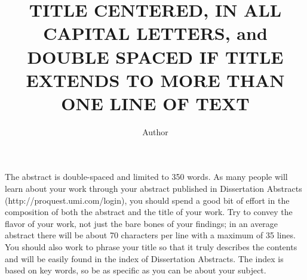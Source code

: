 \documentclass{iuphd}
\begin{document}
\title{TITLE CENTERED, IN ALL CAPITAL LETTERS, and DOUBLE SPACED IF TITLE EXTENDS TO MORE THAN ONE LINE OF TEXT}
\author{Author}
\monthGranted{\DTMmonthname{\month}}
\yearGranted{\the\year}
\maketitle

\acceptancepage%


% 


\begin{abstract*}[\bigskipamount]
 The abstract is double-spaced and limited to 350 words. As many people will learn about
your work through your abstract published in Dissertation Abstracts (http://proquest.umi.com/login),
you should spend a good bit of effort in the composition of both the abstract and the title of your work.
Try to convey the flavor of your work, not just the bare bones of your findings; in an average abstract
there will be about 70 characters per line with a maximum of 35 lines. You should also work to phrase your
title so that it truly describes the contents and will be easily found in the index of Dissertation Abstracts.
The index is based on key words, so be as specific as you can be about your subject. 
\end{abstract*}

\tableofcontents






% 
% 
\end{document}
